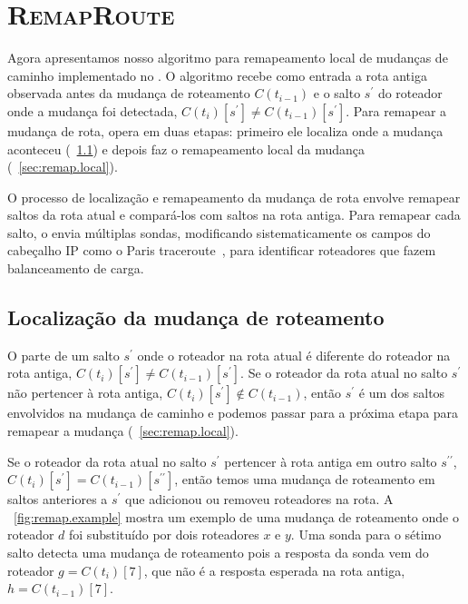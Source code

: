 \section{\textbf{\textsc{RemapRoute}}}
\label{sec:remap}

Agora apresentamos nosso algoritmo para remapeamento local de mudanças
de caminho implementado no \rmprt{}.  O algoritmo recebe como entrada a
rota antiga observada antes da mudança de roteamento $C(t_{i-1})$ e o
salto $s^\prime$ do roteador onde a mudança foi detectada,
$C(t_i)[s^\prime] \ne C(t_{i-1})[s^\prime]$.  Para remapear a mudança de
rota, \rmprt{} opera em duas etapas: primeiro ele localiza onde a
mudança aconteceu (\secstr~\ref{sec:remap.locate}) e depois faz o
remapeamento local da mudança (\secstr~\ref{sec:remap.local}).

O processo de localização e remapeamento da mudança de rota envolve
remapear saltos da rota atual e compará-los com saltos na rota antiga.
Para remapear cada salto, o \rmprt{} envia múltiplas sondas, modificando
sistematicamente os campos do cabeçalho IP como o Paris
traceroute~\cite{augustin07, veitch09balancer}, para identificar
roteadores que fazem balanceamento de carga.

\subsection{Localização da mudança de roteamento}
\label{sec:remap.locate}

O \rmprt{} parte de um salto $s^\prime$ onde o roteador na rota atual é
diferente do roteador na rota antiga, $C(t_i)[s^\prime] \ne
C(t_{i-1})[s^\prime]$.  Se o roteador da rota atual no salto $s^\prime$
não pertencer à rota antiga, $C(t_i)[s^\prime] \notin C(t_{i-1})$, então
$s^\prime$ é um dos saltos envolvidos na mudança de caminho e podemos
passar para a próxima etapa para remapear a mudança
(\secstr~\ref{sec:remap.local}).

Se o roteador da rota atual no salto $s^\prime$ pertencer à rota antiga
em outro salto $s^{\prime\prime}$, $C(t_i)[s^\prime] =
C(t_{i-1})[s^{\prime\prime}]$, então temos uma mudança de roteamento em
saltos anteriores a $s^\prime$ que adicionou ou removeu roteadores na
rota.  A \figstr~\ref{fig:remap.example} mostra um exemplo de uma
mudança de roteamento onde o roteador $d$ foi substituído por dois
roteadores $x$ e $y$.  Uma sonda para o sétimo salto detecta uma mudança
de roteamento pois a resposta da sonda vem do roteador $g = C(t_i)[7]$,
que não é a resposta esperada na rota antiga, $h = C(t_{i-1})[7]$.

